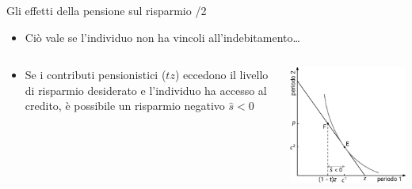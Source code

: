 \documentclass[11pt]{beamer}
\begin{document}
\begin{frame}{Gli effetti della pensione sul risparmio /2}
\begin{itemize}
\item Ciò vale se l'individuo non ha vincoli all'indebitamento\ldots{}
\end{itemize}

\begin{columns}
\begin{column}{.5\columnwidth}
\begin{itemize}
\item Se i contributi pensionistici ($tz$) eccedono il livello di risparmio
desiderato e l'individuo ha accesso al credito, è possibile un risparmio
negativo $\hat s<0$
\end{itemize}
\end{column}

\begin{column}{.5\columnwidth}
\begin{center}
\includegraphics[width=\linewidth]{./figure/effetti-sul-risparmio-3.pdf}
\end{center}
\end{column}
\end{columns}
\end{frame}
\end{document}
